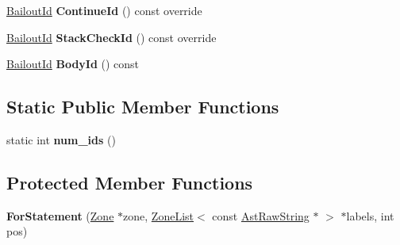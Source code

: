 \begin{DoxyCompactItemize}
\item 
\hyperlink{classv8_1_1internal_1_1_bailout_id}{Bailout\+Id} {\bfseries Continue\+Id} () const  override\hypertarget{classv8_1_1internal_1_1_for_statement_a4201aca0c2f742f08a9a73c391b454c2}{}\label{classv8_1_1internal_1_1_for_statement_a4201aca0c2f742f08a9a73c391b454c2}

\item 
\hyperlink{classv8_1_1internal_1_1_bailout_id}{Bailout\+Id} {\bfseries Stack\+Check\+Id} () const  override\hypertarget{classv8_1_1internal_1_1_for_statement_a28e6acc73b8a1e097c39e63cd3298c75}{}\label{classv8_1_1internal_1_1_for_statement_a28e6acc73b8a1e097c39e63cd3298c75}

\item 
\hyperlink{classv8_1_1internal_1_1_bailout_id}{Bailout\+Id} {\bfseries Body\+Id} () const \hypertarget{classv8_1_1internal_1_1_for_statement_a12a999b995fae4bc39217cd822b94845}{}\label{classv8_1_1internal_1_1_for_statement_a12a999b995fae4bc39217cd822b94845}

\end{DoxyCompactItemize}
\subsection*{Static Public Member Functions}
\begin{DoxyCompactItemize}
\item 
static int {\bfseries num\+\_\+ids} ()\hypertarget{classv8_1_1internal_1_1_for_statement_a7680f424c0be8d11c5ee826973e5cfcd}{}\label{classv8_1_1internal_1_1_for_statement_a7680f424c0be8d11c5ee826973e5cfcd}

\end{DoxyCompactItemize}
\subsection*{Protected Member Functions}
\begin{DoxyCompactItemize}
\item 
{\bfseries For\+Statement} (\hyperlink{classv8_1_1internal_1_1_zone}{Zone} $\ast$zone, \hyperlink{classv8_1_1internal_1_1_zone_list}{Zone\+List}$<$ const \hyperlink{classv8_1_1internal_1_1_ast_raw_string}{Ast\+Raw\+String} $\ast$ $>$ $\ast$labels, int pos)\hypertarget{classv8_1_1internal_1_1_for_statement_aa17521d32376268d4ecb9b13c28c4fba}{}\label{classv8_1_1internal_1_1_for_statement_aa17521d32376268d4ecb9b13c28c4fba}

\end{DoxyCompactItemize}
